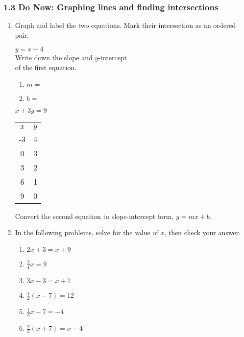 \documentclass[12pt, twoside]{article}
\begin{document}
\subsubsection*{1.3 Do Now: Graphing lines and finding intersections}
\begin{enumerate}
  \item Graph and label the two equations. Mark their intersection as an ordered pair.

  \begin{multicols}{2}
    $y = x-4$ \\[0.5cm]
    Write down the slope and $y$-intercept\\ of the first equation.
    \begin{enumerate}
      \item $m=$ \bigskip
      \item $b=$
    \end{enumerate}

    $x+3y = 9$
      \begin{flushleft}
      \begin{tabular}{c|c}
          $x$ & $y$ \\
          \hline
           -3 & 4 \\[5pt]
           0 & 3 \\[5pt]
           3 & 2 \\[5pt]
           6 & 1 \\[5pt]
           9 & 0 \\
          \end{tabular}
        \end{flushleft}
    \end{multicols}

  \begin{center} %
  \end{center}
Convert the second equation to slope-intercept form, $y=mx+b$.

\newpage
\item In the following problems, solve for the value of $x$, then check your answer.
\begin{multicols}{2}
  \begin{enumerate}[itemsep=5cm]
    \item $2x+3=x + 9$
    \item $\frac{3}{4}x =9$
    \item $3x-3=x + 7$
    \item $\frac{1}{2}(x-7)=12$
    \item $\frac{1}{3} x-7=-4$    
    \item $\frac{2}{3}(x+7)=x-4$
  \end{enumerate}
  \end{multicols} \vspace{4cm}



\end{enumerate}
\end{document}
